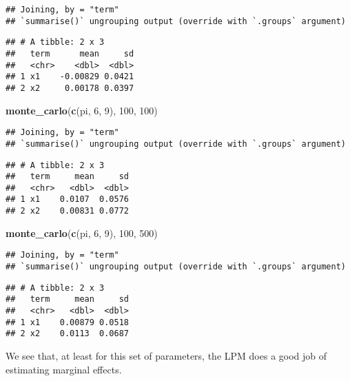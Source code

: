 \documentclass[
]{article}
\newenvironment{Shaded}{\begin{snugshade}}{\end{snugshade}}
\newcommand{\DecValTok}[1]{\textcolor[rgb]{0.00,0.00,0.81}{#1}}
\newcommand{\KeywordTok}[1]{\textcolor[rgb]{0.13,0.29,0.53}{\textbf{#1}}}
\newcommand{\NormalTok}[1]{#1}
\begin{document}
\begin{verbatim}
## Joining, by = "term"
## `summarise()` ungrouping output (override with `.groups` argument)
\end{verbatim}

\begin{verbatim}
## # A tibble: 2 x 3
##   term      mean     sd
##   <chr>    <dbl>  <dbl>
## 1 x1    -0.00829 0.0421
## 2 x2     0.00178 0.0397
\end{verbatim}

\begin{Shaded}
\begin{Highlighting}[]
\KeywordTok{monte\_carlo}\NormalTok{(}\KeywordTok{c}\NormalTok{(pi, }\DecValTok{6}\NormalTok{, }\DecValTok{9}\NormalTok{), }\DecValTok{100}\NormalTok{, }\DecValTok{100}\NormalTok{)}
\end{Highlighting}
\end{Shaded}

\begin{verbatim}
## Joining, by = "term"
## `summarise()` ungrouping output (override with `.groups` argument)
\end{verbatim}

\begin{verbatim}
## # A tibble: 2 x 3
##   term     mean     sd
##   <chr>   <dbl>  <dbl>
## 1 x1    0.0107  0.0576
## 2 x2    0.00831 0.0772
\end{verbatim}

\begin{Shaded}
\begin{Highlighting}[]
\KeywordTok{monte\_carlo}\NormalTok{(}\KeywordTok{c}\NormalTok{(pi, }\DecValTok{6}\NormalTok{, }\DecValTok{9}\NormalTok{), }\DecValTok{100}\NormalTok{, }\DecValTok{500}\NormalTok{)}
\end{Highlighting}
\end{Shaded}

\begin{verbatim}
## Joining, by = "term"
## `summarise()` ungrouping output (override with `.groups` argument)
\end{verbatim}

\begin{verbatim}
## # A tibble: 2 x 3
##   term     mean     sd
##   <chr>   <dbl>  <dbl>
## 1 x1    0.00879 0.0518
## 2 x2    0.0113  0.0687
\end{verbatim}

We see that, at least for this set of parameters, the LPM does a good job of estimating marginal
effects.
\end{document}
